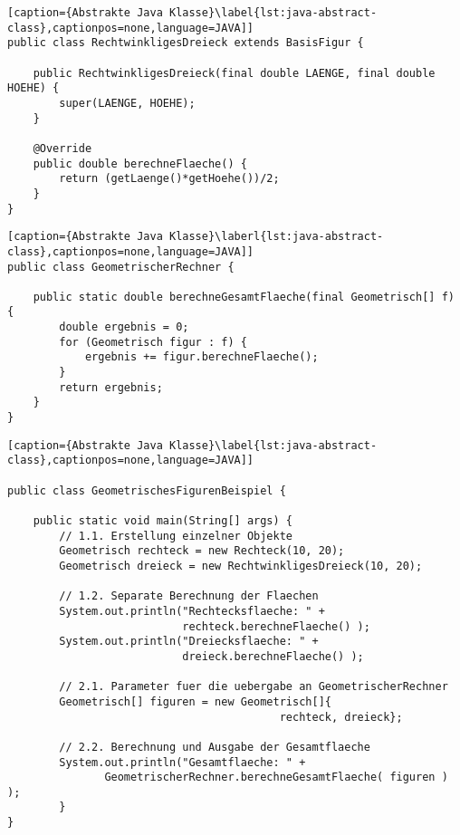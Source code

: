 \begin{minipage}[t]{0.45\linewidth}



\end{minipage}%
\hfill
\begin{minipage}[t]{0.45\linewidth}
	 \begin{lstlisting}[caption={Abstrakte Java Klasse}\label{lst:java-abstract-class},captionpos=none,language=JAVA]]
public class RechtwinkligesDreieck extends BasisFigur {

    public RechtwinkligesDreieck(final double LAENGE, final double HOEHE) {
        super(LAENGE, HOEHE);
    }

    @Override
    public double berechneFlaeche() {
        return (getLaenge()*getHoehe())/2;
    }
}
	\end{lstlisting}
\end{minipage}
\hfill
\begin{minipage}[t]{0.45\linewidth}

	 \begin{lstlisting}[caption={Abstrakte Java Klasse}\laberl{lst:java-abstract-class},captionpos=none,language=JAVA]]
public class GeometrischerRechner {

    public static double berechneGesamtFlaeche(final Geometrisch[] f) {
        double ergebnis = 0;
        for (Geometrisch figur : f) {
            ergebnis += figur.berechneFlaeche();
        }
        return ergebnis;
    }
}
	\end{lstlisting}

\end{minipage}%
\hfill
\begin{minipage}[t]{0.45\linewidth}
		 \begin{lstlisting}[caption={Abstrakte Java Klasse}\label{lst:java-abstract-class},captionpos=none,language=JAVA]] 
	 
public class GeometrischesFigurenBeispiel {

    public static void main(String[] args) {
        // 1.1. Erstellung einzelner Objekte
        Geometrisch rechteck = new Rechteck(10, 20);
        Geometrisch dreieck = new RechtwinkligesDreieck(10, 20);
		
        // 1.2. Separate Berechnung der Flaechen 
        System.out.println("Rechtecksflaeche: " + 
                           rechteck.berechneFlaeche() );
        System.out.println("Dreiecksflaeche: " + 
                           dreieck.berechneFlaeche() );
		
        // 2.1. Parameter fuer die uebergabe an GeometrischerRechner
        Geometrisch[] figuren = new Geometrisch[]{
                                          rechteck, dreieck};
		
        // 2.2. Berechnung und Ausgabe der Gesamtflaeche
        System.out.println("Gesamtflaeche: " + 
               GeometrischerRechner.berechneGesamtFlaeche( figuren ) );
        }
}  
    
	\end{lstlisting}
\end{minipage}